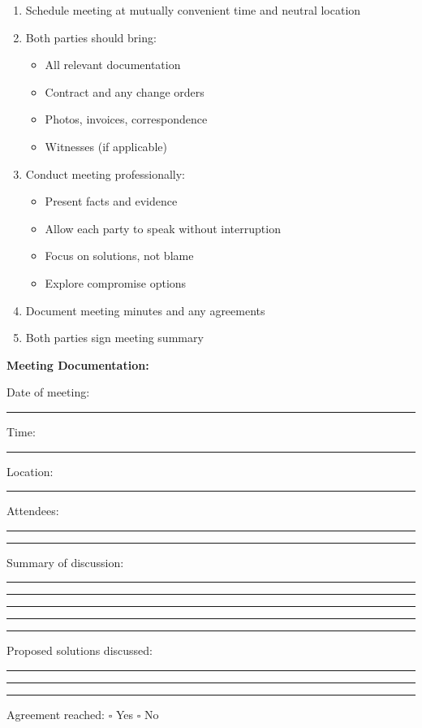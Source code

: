 \documentclass[11pt,letterpaper]{article}
\begin{document}
\begin{enumerate}
\item Schedule meeting at mutually convenient time and neutral location
\item Both parties should bring:
   \begin{itemize}
   \item All relevant documentation
   \item Contract and any change orders
   \item Photos, invoices, correspondence
   \item Witnesses (if applicable)
   \end{itemize}
\item Conduct meeting professionally:
   \begin{itemize}
   \item Present facts and evidence
   \item Allow each party to speak without interruption
   \item Focus on solutions, not blame
   \item Explore compromise options
   \end{itemize}
\item Document meeting minutes and any agreements
\item Both parties sign meeting summary
\end{enumerate}

\vspace{6pt}

\textbf{Meeting Documentation:}

Date of meeting: \rule{4cm}{0.4pt} Time: \rule{3cm}{0.4pt}

Location: \rule{10cm}{0.4pt}

Attendees: \rule{11cm}{0.4pt}

\rule{14cm}{0.4pt}

Summary of discussion:

\rule{14cm}{0.4pt}

\rule{14cm}{0.4pt}

\rule{14cm}{0.4pt}

\rule{14cm}{0.4pt}

\rule{14cm}{0.4pt}

Proposed solutions discussed:

\rule{14cm}{0.4pt}

\rule{14cm}{0.4pt}

\rule{14cm}{0.4pt}

Agreement reached: $\square$ Yes $\square$ No
\end{document}
